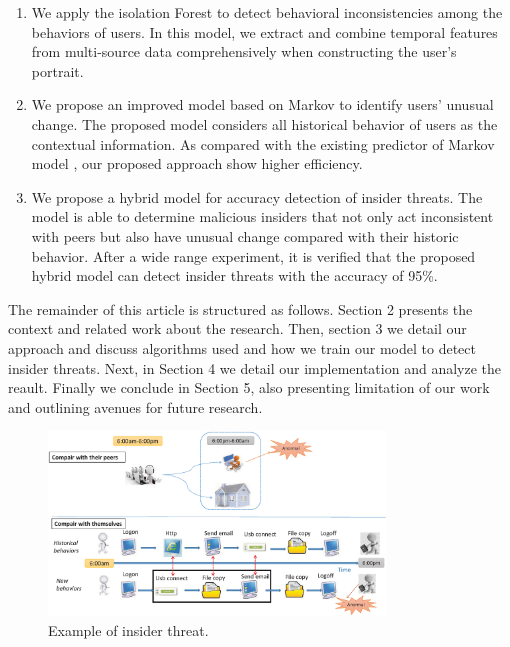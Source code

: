 \documentclass[conference]{IEEEtran}
\begin{document}
\begin{enumerate}
\item 
We apply the isolation Forest to detect behavioral inconsistencies among the behaviors of users. In this model, we extract and combine temporal features from multi-source data comprehensively when constructing the user's portrait.

\item We propose an improved model based on Markov to identify users' unusual change. The proposed model considers all historical behavior of users as the contextual information. As compared with the existing predictor of Markov model \cite{b10}, our proposed approach show higher efficiency.

\item We propose a hybrid model for accuracy detection of insider threats. The model is able to determine malicious insiders that not only act inconsistent with peers but also have unusual change compared with their historic behavior. 
After a wide range experiment, it is verified that the proposed hybrid model can detect insider threats with the accuracy of 95\%. 


\end{enumerate}

The remainder of this article is structured as follows. 
Section 2 presents the context and related work about the research.
Then, section 3 we detail our approach and discuss algorithms used and how we train our model to detect insider threats. Next, in Section 4
we detail our implementation and analyze the reault. 
Finally we conclude in Section 5, also presenting limitation of our work
and outlining avenues for future research.
\begin{figure}[htb]
\centerline{\includegraphics[width = 0.8\textwidth]{figure/figure1.eps}}
\caption{Example of insider threat.}
\label{fig}
\end{figure}
\end{document}

